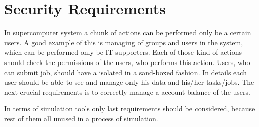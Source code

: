 \documentclass{report}
\begin{document}
\section{Security Requirements}
In supercomputer system a chunk of actions can be performed only be a certain users. A good example of this is managing of groups and users in the system, which can be performed only be IT supporters. Each of those kind of actions should check the permissions of the users, who performs this action. Users, who can submit job, should have a isolated in a sand-boxed fashion. In details each user should be able to see and manage only his data and  his/her tasks/jobs. The next crucial requirements is to correctly manage a account balance of the users.

In terms of simulation tools only last requirements should be considered, because rest of them all unused in a process of simulation.


\end{document}
